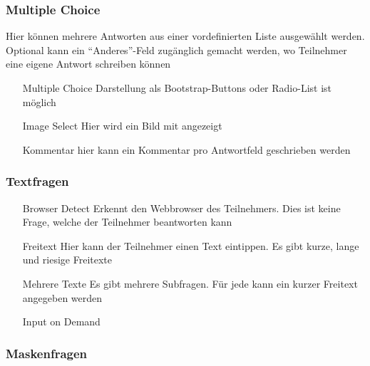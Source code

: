 \subsubsection{Multiple Choice}

Hier können mehrere Antworten aus einer vordefinierten Liste ausgewählt werden.
Optional kann ein \enquote{Anderes}-Feld zugänglich gemacht werden, wo Teilnehmer eine eigene Antwort schreiben können

\begin{itemize}
	\item[Multiple Choice] Darstellung als Bootstrap-Buttons oder Radio-List ist möglich
	\item[Image Select] Hier wird ein Bild mit angezeigt
	\item[Kommentar] hier kann ein Kommentar pro Antwortfeld geschrieben werden
\end{itemize}

\subsubsection{Textfragen}

\begin{itemize}
	\item[Browser Detect] Erkennt den Webbrowser des Teilnehmers. Dies ist keine Frage, welche der Teilnehmer beantworten kann
	\item[Freitext] Hier kann der Teilnehmer einen Text eintippen. Es gibt kurze, lange und riesige Freitexte
	\item[Mehrere Texte] Es gibt mehrere Subfragen. Für jede kann ein kurzer Freitext angegeben werden
	\item[Input on Demand] %
\end{itemize}

\subsubsection{Maskenfragen}

